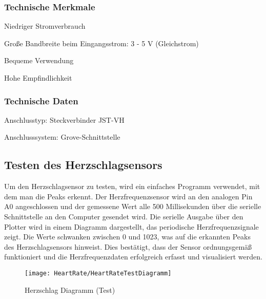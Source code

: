 \subsubsection{Technische Merkmale}

\begin{description}
    \item{Niedriger Stromverbrauch}
    \item{Große Bandbreite beim Eingangsstrom:} 3 - 5 V (Gleichstrom)
    \item{Bequeme Verwendung}
    \item{Hohe Empfindlichkeit}
\end{description}

\subsubsection{Technische Daten}

\begin{description}
    \item{Anschlusstyp:} Steckverbinder JST-VH
    \item{Anschlusssystem:} Grove-Schnittstelle
\end{description} 
\cite{Seeed:2015}



\subsection{Testen des Herzschlagsensors}

Um den Herzschlagsensor zu testen, wird ein einfaches Programm verwendet, mit dem man die Peaks erkennt. Der Herzfrequenzsensor wird an den analogen Pin A0 angeschlossen und der gemessene Wert alle 500 Millisekunden über die serielle Schnittstelle an den Computer gesendet wird. Die serielle Ausgabe über den Plotter wird in einem Diagramm dargestellt, das periodische Herzfrequenzsignale zeigt. Die Werte schwanken zwischen 0 und 1023, was auf die erkannten Peaks des Herzschlagsensors hinweist. Dies bestätigt, dass der Sensor ordnungsgemäß funktioniert und die Herzfrequenzdaten erfolgreich erfasst und visualisiert werden.


\begin{figure}[h]
    \begin{center}
        \texttt{[image: HeartRate/HeartRateTestDiagramm]}
        \caption{Herzschlag Diagramm (Test)}
        \label{fig:HerzschlagDiagramm}	
    \end{center}
\end{figure}

